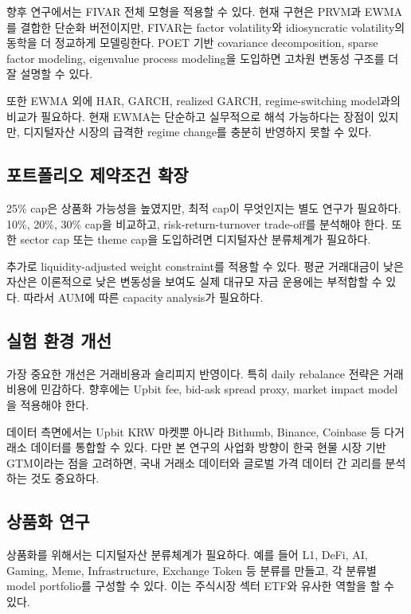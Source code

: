 \documentclass[12pt,a4paper]{article}
\begin{document}
향후 연구에서는 FIVAR 전체 모형을 적용할 수 있다. 현재 구현은 PRVM과 EWMA를 결합한 단순화 버전이지만, FIVAR는 factor volatility와 idiosyncratic volatility의 동학을 더 정교하게 모델링한다. POET 기반 covariance decomposition, sparse factor modeling, eigenvalue process modeling을 도입하면 고차원 변동성 구조를 더 잘 설명할 수 있다.

또한 EWMA 외에 HAR, GARCH, realized GARCH, regime-switching model과의 비교가 필요하다. 현재 EWMA는 단순하고 실무적으로 해석 가능하다는 장점이 있지만, 디지털자산 시장의 급격한 regime change를 충분히 반영하지 못할 수 있다.

\subsection{포트폴리오 제약조건 확장}

25\% cap은 상품화 가능성을 높였지만, 최적 cap이 무엇인지는 별도 연구가 필요하다. 10\%, 20\%, 30\% cap을 비교하고, risk-return-turnover trade-off를 분석해야 한다. 또한 sector cap 또는 theme cap을 도입하려면 디지털자산 분류체계가 필요하다.

추가로 liquidity-adjusted weight constraint를 적용할 수 있다. 평균 거래대금이 낮은 자산은 이론적으로 낮은 변동성을 보여도 실제 대규모 자금 운용에는 부적합할 수 있다. 따라서 AUM에 따른 capacity analysis가 필요하다.

\subsection{실험 환경 개선}

가장 중요한 개선은 거래비용과 슬리피지 반영이다. 특히 daily rebalance 전략은 거래비용에 민감하다. 향후에는 Upbit fee, bid-ask spread proxy, market impact model을 적용해야 한다.

데이터 측면에서는 Upbit KRW 마켓뿐 아니라 Bithumb, Binance, Coinbase 등 다거래소 데이터를 통합할 수 있다. 다만 본 연구의 사업화 방향이 한국 현물 시장 기반 GTM이라는 점을 고려하면, 국내 거래소 데이터와 글로벌 가격 데이터 간 괴리를 분석하는 것도 중요하다.

\subsection{상품화 연구}

상품화를 위해서는 디지털자산 분류체계가 필요하다. 예를 들어 L1, DeFi, AI, Gaming, Meme, Infrastructure, Exchange Token 등 분류를 만들고, 각 분류별 model portfolio를 구성할 수 있다. 이는 주식시장 섹터 ETF와 유사한 역할을 할 수 있다.
\end{document}
